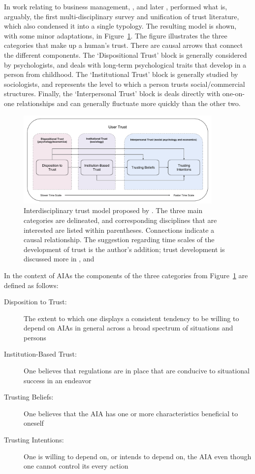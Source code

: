         In work relating to business management, \citet{McKnight1998-ty}, and later \citet{McKnight2001-fa}, performed what is, arguably, the first multi-disciplinary survey and unification of trust literature, which also condensed it into a single typology. The resulting model is shown, with some minor adaptations, in Figure~\ref{fig:UserTrust}. The figure illustrates the three categories that make up a human's trust. There are causal arrows that connect the different components. The `Dispositional Trust' block is generally considered by psychologists, and deals with long-term psychological traits that develop in a person from childhood. The `Institutional Trust' block is generally studied by sociologists, and represents the level to which a person trusts social/commercial structures. Finally, the `Interpersonal Trust' block is deals directly with one-on-one relationships and can generally fluctuate more quickly than the other two.

        \begin{figure}[htbp]
            \centering
            \includegraphics[width=0.9\textwidth]{Figures/UserTrust}
            \caption{Interdisciplinary trust model proposed by \citet{McKnight2001-fa}. The three main categories are delineated, and corresponding disciplines that are interested are listed within parentheses. Connections indicate a causal relationship. The suggestion regarding time scales of the development of trust is the author's addition; trust development is discussed more in \cite{Lewicki2006-gp}, and \cite{Lewicki2006-hj}}
            \label{fig:UserTrust}
        \end{figure}

        In the context of AIAs the components of the three categories from Figure~\ref{fig:UserTrust} are defined as follows:

        \begin{description}
            \item [Disposition to Trust:] The extent to which one displays a consistent tendency to be willing to depend on AIAs in general across a broad spectrum of situations and persons
            \item [Institution-Based Trust:] One believes that regulations are in place that are conducive to situational success in an endeavor
            \item [Trusting Beliefs:] One believes that the AIA has one or more characteristics beneficial to oneself
            \item [Trusting Intentions:] One is willing to depend on, or intends to depend on, the AIA even though one cannot control its every action
        \end{description}

